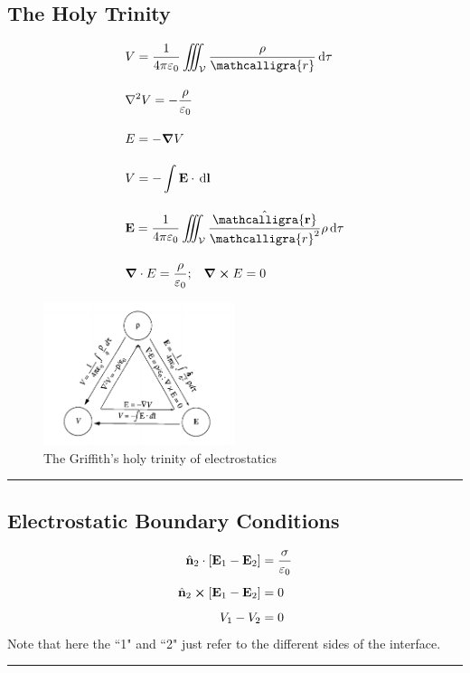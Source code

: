 \documentclass[12pt,english]{article}
\newcommand{\dmr}[1]{\, \mathrm{d}#1} %
\numberwithin{equation}{subsection}
\newcommand{\curly}[1]{\ensuremath{\mathcalligra{#1}}}
\let\oldhat\hat
\renewcommand{\vec}[1]{\mathbf{#1}}
\renewcommand{\hat}[1]{\oldhat{\mathbf{#1}}}
\begin{document}
\subsection{The Holy Trinity}
\begin{align}
    &V = \frac{1}{4\pi\varepsilon_0}\iiint_{\mathcal{V}} \frac{\rho}{\curly{r}}\dmr{\tau}\\[1em]
    &\laplacian V = -\frac{\rho}{\varepsilon_0}\\[1em]
    &E = - \grad V\\[1em]
    &V = -\int \vec{E}\cdot \dmr{\vec{l}}\\[1em]
    &\vec{E} = \frac{1}{4\pi\varepsilon_0}\iiint_{\mathcal{V}} \frac{\hat{\curly{r}}}{\curly{r}^2}\rho\dmr{\tau}\\[1em]
    &\grad \cdot E = \frac{\rho}{\varepsilon_0}; \;\;\; \grad \cross E = 0
\end{align}
\begin{figure}[h]
    \centering
    \includegraphics[width =0.5\textwidth]{holytrinity.png}
    \caption{The Griffith's holy trinity of electrostatics\cite{Griffiths:611579}}
\end{figure}

\par\noindent\rule{\textwidth}{0.4pt}
\subsection{Electrostatic Boundary Conditions}
\begin{align}
    \hat{n}_2 \cdot [\vec{E}_1-\vec{E}_2] &= \frac{\sigma}{\varepsilon_0}\\[0.5em]
    \hat{n}_2 \cross [\vec{E}_1-\vec{E}_2] &= 0\\[0.5em]
    V_1 - V_2 &= 0
\end{align}
Note that here the ``1" and ``2" just refer to the different sides of the interface.

\par\noindent\rule{\textwidth}{0.4pt}
\end{document}

